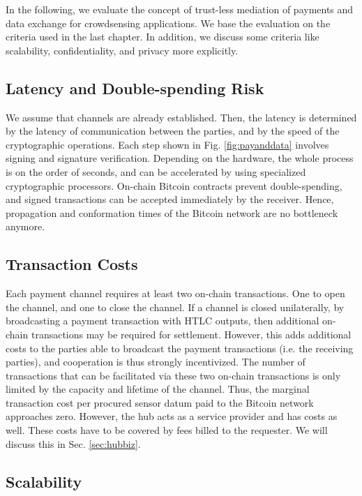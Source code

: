 In the following, we evaluate the concept of trust-less mediation of payments and data exchange for crowdsensing applications. We base the evaluation on the criteria used in the last chapter. In addition, we discuss some criteria like scalability, confidentiality, and privacy more explicitly.  

\subsection{Latency and Double-spending Risk}

We assume that channels are already established. Then, the latency is determined by the latency of communication between the parties, and by the speed of the cryptographic operations. Each step shown in Fig. \ref{fig:payanddata} involves signing and signature verification. Depending on the hardware, the whole process is on the order of seconds, and can be accelerated by using specialized cryptographic processors. On-chain Bitcoin contracts prevent double-spending, and signed transactions can be accepted immediately by the receiver. Hence, propagation and conformation times of the Bitcoin network are no bottleneck anymore.

\subsection{Transaction Costs}

Each payment channel requires at least two on-chain transactions. One to open the channel, and one to close the channel. If a channel is closed unilaterally, by broadcasting a payment transaction with \ac{HTLC} outputs, then additional on-chain transactions may be required for settlement. However, this adds additional costs to the parties able to broadcast the payment transactions (i.e. the receiving parties), and cooperation is thus strongly incentivized. 
The number of transactions that can be facilitated via these two on-chain transactions is only limited by the capacity and lifetime of the channel. Thus, the marginal transaction cost per procured sensor datum paid to the Bitcoin network approaches zero. However, the hub acts as a service provider and has costs as well. These costs have to be covered by fees billed to the requester. We will discuss this in Sec. \ref{sec:hubbiz}.

\subsection{Scalability}

